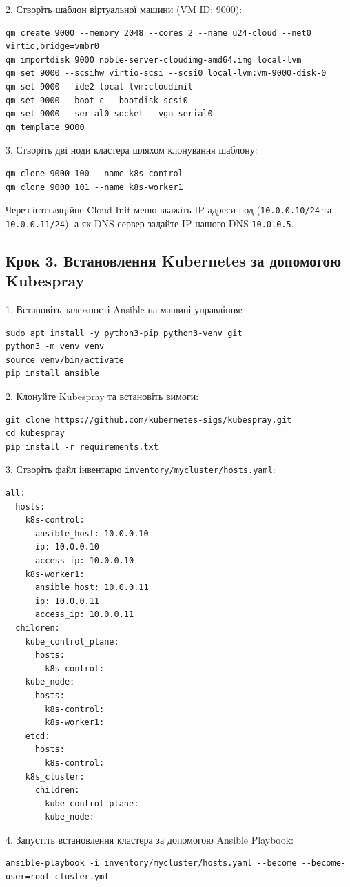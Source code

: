\documentclass{article}
\begin{document}
2. Створіть шаблон віртуальної машини (VM ID: 9000):
\begin{lstlisting}
qm create 9000 --memory 2048 --cores 2 --name u24-cloud --net0 virtio,bridge=vmbr0
qm importdisk 9000 noble-server-cloudimg-amd64.img local-lvm
qm set 9000 --scsihw virtio-scsi --scsi0 local-lvm:vm-9000-disk-0
qm set 9000 --ide2 local-lvm:cloudinit
qm set 9000 --boot c --bootdisk scsi0
qm set 9000 --serial0 socket --vga serial0
qm template 9000
\end{lstlisting}

3. Створіть дві ноди кластера шляхом клонування шаблону:
\begin{lstlisting}
qm clone 9000 100 --name k8s-control
qm clone 9000 101 --name k8s-worker1
\end{lstlisting}
Через інтегляційне Cloud-Init меню вкажіть IP-адреси нод (\texttt{10.0.0.10/24} та \texttt{10.0.0.11/24}), а як DNS-сервер задайте IP нашого DNS \texttt{10.0.0.5}.

\subsection{Крок 3. Встановлення Kubernetes за допомогою Kubespray}
1. Встановіть залежності Ansible на машині управління:
\begin{lstlisting}
sudo apt install -y python3-pip python3-venv git
python3 -m venv venv
source venv/bin/activate
pip install ansible
\end{lstlisting}

2. Клонуйте Kubespray та встановіть вимоги:
\begin{lstlisting}
git clone https://github.com/kubernetes-sigs/kubespray.git
cd kubespray
pip install -r requirements.txt
\end{lstlisting}

3. Створіть файл інвентарю \texttt{inventory/mycluster/hosts.yaml}:
\begin{lstlisting}
all:
  hosts:
    k8s-control:
      ansible_host: 10.0.0.10
      ip: 10.0.0.10
      access_ip: 10.0.0.10
    k8s-worker1:
      ansible_host: 10.0.0.11
      ip: 10.0.0.11
      access_ip: 10.0.0.11
  children:
    kube_control_plane:
      hosts:
        k8s-control:
    kube_node:
      hosts:
        k8s-control:
        k8s-worker1:
    etcd:
      hosts:
        k8s-control:
    k8s_cluster:
      children:
        kube_control_plane:
        kube_node:
\end{lstlisting}

4. Запустіть встановлення кластера за допомогою Ansible Playbook:
\begin{lstlisting}
ansible-playbook -i inventory/mycluster/hosts.yaml --become --become-user=root cluster.yml
\end{lstlisting}
\end{document}
